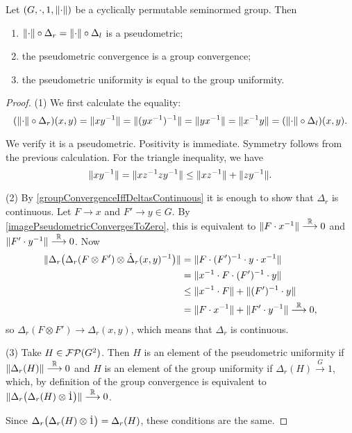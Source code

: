 \begin{proposition} \label{groupSeminormConvergence}
Let $\sSet{G, \cdot, 1, \norm{\cdot}}$ be a cyclically permutable seminormed group. Then 
\begin{enumerate}
\item $\lVert\cdot\rVert\circ \Delta_r = \lVert\cdot\rVert\circ \Delta_l$ is a pseudometric;
\item the pseudometric convergence is a group convergence;
\item the pseudometric uniformity is equal to the group uniformity.
\end{enumerate} 
\end{proposition}
\begin{proof}
(1) We first calculate the equality:
\[ (\lVert\cdot\rVert\circ \Delta_r)(x,y) = \lVert xy^{-1}\rVert = \lVert(yx^{-1})^{-1}\rVert = \lVert yx^{-1}\rVert = \lVert x^{-1}y\rVert = (\lVert\cdot\rVert\circ \Delta_l)(x,y). \]

We verify it is a pseudometric. Positivity is immediate. Symmetry follows from the previous calculation. For the triangle inequality, we have
\[ \lVert xy^{-1}\rVert = \lVert xz^{-1}zy^{-1}\rVert \leq \lVert xz^{-1}\rVert + \lVert zy^{-1}\rVert. \]

(2) By \ref{groupConvergenceIffDeltasContinuous} it is enough to show that $\Delta_r$ is continuous. Let $F\to x$ and $F'\to y\in G$. By \ref{imagePseudometricConvergesToZero}, this is equivalent to $\lVert F\cdot x^{-1}\rVert \overset{\mathbb{R}}{\longrightarrow} 0$ and $\lVert F'\cdot y^{-1}\rVert \overset{\mathbb{R}}{\longrightarrow} 0$. Now
\begin{align*}
\lVert\Delta_r\big(\Delta_r(F\otimes F')\otimes \dot\Delta_r(x,y)^{-1}\big)\rVert &= \lVert F\cdot (F')^{-1}\cdot y\cdot x^{-1}\rVert \\
&= \lVert x^{-1}\cdot F\cdot (F')^{-1}\cdot y\rVert \\
&\leq \lVert x^{-1}\cdot F\rVert+ \lVert(F')^{-1}\cdot y\rVert \\
&= \lVert F\cdot x^{-1}\rVert + \lVert F'\cdot y^{-1}\rVert \overset{\mathbb{R}}{\longrightarrow} 0,
\end{align*}
so $\Delta_r(F\otimes F')\to \Delta_r(x,y)$, which means that $\Delta_r$ is continuous.

(3) Take $H\in\operatorname{\mathcal{FP}}(G^2)$. Then $H$ is an element of the pseudometric uniformity if $\lVert\Delta_r(H)\rVert\overset{\mathbb{R}}{\longrightarrow} 0$ and $H$ is an element of the group uniformity if $\Delta_r(H)\overset{G}{\longrightarrow} 1$, which, by definition of the group convergence is equivalent to $\lVert\Delta_r\big(\Delta_r(H)\otimes\dot{1}\big)\rVert\overset{\mathbb{R}}{\longrightarrow} 0$.

Since $\Delta_r\big(\Delta_r(H)\otimes\dot{1}\big) = \Delta_r(H)$, these conditions are the same.
\end{proof}

